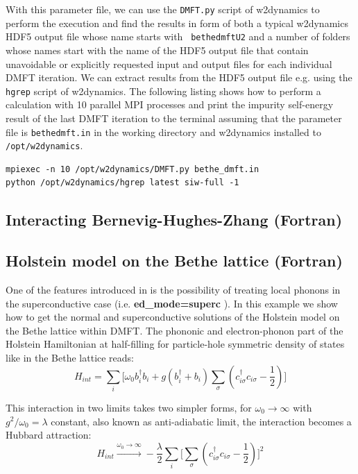 \documentclass[edipack2.tex]{subfiles}
\begin{document}
With this parameter file, we can use the {\tt DMFT.py} script of
w2dynamics to perform the execution and find the results in form of
both a typical w2dynamics HDF5 output file whose name starts with {\tt
  bethe\textunderscore{}dmft\textunderscore{}U2} and a number of folders whose names start with the
name of the HDF5 output file that contain unavoidable or explicitly
requested \NAME input and output files for each individual DMFT
iteration. We can extract results from the HDF5 output file e.g. using
the {\tt hgrep} script of w2dynamics. The following listing shows how
to perform a calculation with 10 parallel MPI processes and print the
impurity self-energy result of the last DMFT iteration to the terminal
assuming that the parameter file is {\tt bethe\textunderscore{}dmft.in} in the working
directory and w2dynamics installed to {\tt /opt/w2dynamics}.

\begin{lstlisting}[style=mybash]
mpiexec -n 10 /opt/w2dynamics/DMFT.py bethe_dmft.in
python /opt/w2dynamics/hgrep latest siw-full -1
\end{lstlisting}

\subsection{Interacting Bernevig-Hughes-Zhang (Fortran)}

\subsection{Holstein model on the Bethe lattice (Fortran)}

One of the features introduced in \NAME is the possibility of treating local phonons in the superconductive case (i.e. \textbf{ed\_mode=superc} ). In this example we show how to get the normal and superconductive solutions of the Holstein model on the Bethe lattice within DMFT. The phononic and electron-phonon part of the Holstein Hamiltonian at half-filling for particle-hole symmetric density of states like in the Bethe lattice reads:
\begin{equation} \label{eqex:H_Holstein}
    H_{int} = \sum_i \Big[\omega_0 b^\dagger_i b_i + g(b^\dagger_i + b_i)\sum_{\sigma}(c^\dagger_{i\sigma}c_{i\sigma} -\frac{1}{2})\Big]
\end{equation}

This interaction in two limits takes two simpler forms, for $\omega_0 \rightarrow \infty$ with $g^2/\omega_0=\lambda$ constant, also known as anti-adiabatic limit, the interaction becomes a Hubbard attraction:
\begin{equation}
    H_{int} \overset{ \omega_0 \rightarrow \infty}{ \longrightarrow } -\frac{\lambda}{2} \sum_i \Big[\sum_\sigma(c^\dagger_{i\sigma}c_{i\sigma} -\frac{1}{2}) \Big]^2
\end{equation}
\end{document}
